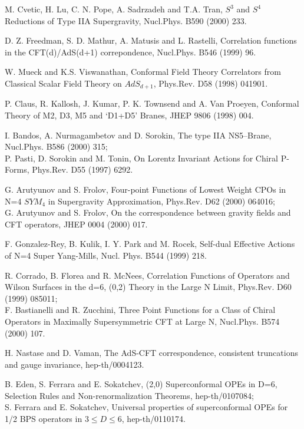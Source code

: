 \documentclass[a4paper,11pt]{article}
\begin{document}
\begin{thebibliography}{99}
M. Cvetic, H. Lu, C. N. Pope, A. Sadrzadeh and T.A. Tran, $S^3$
and $S^4$ Reductions of Type IIA Supergravity, Nucl.Phys. B590
(2000) 233.



D. Z. Freedman, S. D. Mathur, A. Matusis and L. Rastelli,
Correlation functions in the CFT(d)/AdS(d+1) correpondence,
Nucl.Phys. B546 (1999) 96.

W. Mueck and K.S. Viswanathan,
Conformal Field Theory Correlators from Classical Scalar Field Theory on
$AdS_{d+1}$, Phys.Rev. D58 (1998) 041901.


P. Claus, R. Kallosh, J. Kumar, P. K. Townsend and A. Van Proeyen,
Conformal Theory of M2, D3, M5 and `D1+D5' Branes, JHEP 9806 (1998) 004.


I. Bandos, A. Nurmagambetov and D. Sorokin, The type IIA
NS5--Brane, Nucl.Phys. B586 (2000) 315;\\
P. Pasti, D. Sorokin and M. Tonin, On Lorentz Invariant Actions
for Chiral P-Forms, Phys.Rev. D55 (1997) 6292.


G. Arutyunov and S. Frolov,
Four-point Functions of Lowest Weight CPOs in N=4 $SYM_4$ in Supergravity Approximation,
Phys.Rev. D62 (2000) 064016;\\
G. Arutyunov and S. Frolov,
On the correspondence between gravity fields and CFT operators,
JHEP 0004 (2000) 017.

F. Gonzalez-Rey, B. Kulik, I. Y. Park and M. Rocek, Self-dual
Effective Actions of N=4 Super Yang-Mills, Nucl. Phys. B544 (1999)
218.


R. Corrado, B. Florea and R. McNees, Correlation Functions of
Operators and Wilson Surfaces in the d=6, (0,2) Theory in
the Large N Limit, Phys.Rev. D60 (1999) 085011;\\
F. Bastianelli and R. Zucchini, Three Point Functions for a Class
of Chiral Operators in Maximally Supersymmetric CFT at Large N,
Nucl.Phys. B574 (2000) 107.

H. Nastase and D. Vaman, The AdS-CFT correspondence, consistent
truncations and gauge invariance, hep-th/0004123.

B. Eden, S. Ferrara and E. Sokatchev, (2,0) Superconformal OPEs in
D=6, Selection Rules and Non-renormalization Theorems,
hep-th/0107084;\\
S. Ferrara and E. Sokatchev, Universal properties of
superconformal OPEs for 1/2 BPS operators in $3\leq D \leq 6$,
hep-th/0110174.















\end{thebibliography}
\end{document}
